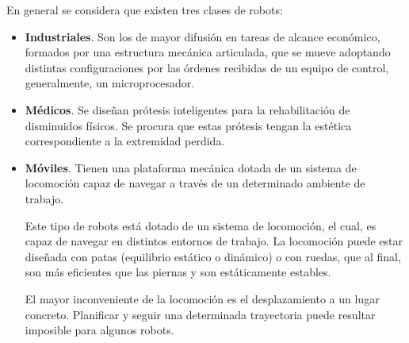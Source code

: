 En general se considera que existen tres clases de robots:
\begin{itemize}
\item \textbf{Industriales}. Son los de mayor difusión en tareas de alcance económico, formados por una estructura mecánica articulada, que se mueve adoptando distintas configuraciones por las órdenes recibidas de un equipo de control, generalmente, un microprocesador.
\item \textbf{Médicos}. Se diseñan prótesis inteligentes para la rehabilitación de disminuidos físicos. Se procura que estas prótesis tengan la estética correspondiente a la extremidad perdida.
\item \textbf{Móviles}. Tienen una plataforma mecánica dotada de un sistema de locomoción capaz de navegar a través de un determinado ambiente de trabajo.

Este tipo de robots está dotado de un sistema de locomoción, el cual, es capaz de navegar en distintos entornos de trabajo. La locomoción puede estar diseñada con patas (equilibrio estático o dinámico) o con ruedas, que al final, son más eficientes que las piernas y son estáticamente estables. 

El mayor inconveniente de la locomoción es el desplazamiento a un lugar concreto. Planificar y seguir una determinada trayectoria puede resultar imposible para algunos robots.


\end{itemize}
